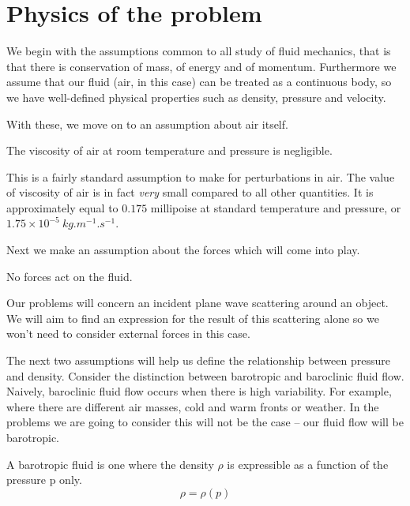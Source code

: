 \section{Physics of the problem}
We begin with the assumptions common to all study of fluid mechanics, that is that there is conservation of mass, of energy and of momentum. Furthermore we assume that our fluid (air, in this case) can be treated as a continuous body, so we have well-defined physical properties such as density, pressure and velocity.\par
%
With these, we move on to an assumption about air itself.\par
\begin{assumption}\label{assumption:no_viscosity}
  The viscosity of air at room temperature and pressure is negligible.
\end{assumption}
%
This is a fairly standard assumption to make for perturbations in air. The value of viscosity of air is in fact \emph{very} small compared to all other quantities. It is approximately equal to $0.175$ millipoise \cite[Table 333]{forsythe03tables} at standard temperature and pressure, or $1.75\times10^{-5} ~\si{kg.m^{-1}.s^{-1}}$.\par
%
Next we make an assumption about the forces which will come into play.
\begin{assumption}\label{assumption:no_external_forces}
  No forces act on the fluid.
\end{assumption}
%
Our problems will concern an incident plane wave scattering around an object. We will aim to find an expression for the result of this scattering alone so we won't need to consider external forces in this case. \par
%
The next two assumptions will help us define the relationship between pressure and density.
%
Consider the distinction between barotropic and baroclinic fluid flow. Naively, baroclinic fluid flow occurs when there is high variability. For example, where there are different air masses, cold and warm fronts or weather. In the problems we are going to consider this will not be the case -- our fluid flow will be barotropic.
\begin{defn} \parencite{shames02mechanics} A barotropic fluid is one where the density $\rho$ is expressible as a function of the pressure p only.
    \[ \rho = \rho(p)\]
\end{defn}

